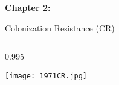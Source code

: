 \begin{frame}[plain]
    \centering \hspace*{-1cm} \vspace*{-4cm}
        \begin{minipage}{0.8\textwidth}
            \centering
                {\LARGE
                    \textbf{Chapter 2:} \Large\textit{\chaptertwo}}
        \end{minipage}
        \vfill
\end{frame}

\begin{frame}{Colonization Resistance (CR)}
    \vspace*{-10mm} %
    \begin{minipage}[t][\usableheight][t]{\usablewidth}
        \begin{columns}[T]  
            \begin{column}{0.995\usablewidth} 
                \begin{block}{\tiny\cite{van_der_waaij_colonization_1971}}
                \centering \vspace*{2mm} %
                    \texttt{[image: 1971CR.jpg]}
                \end{block}
            \end{column}
        \end{columns}
    \end{minipage}
\end{frame}